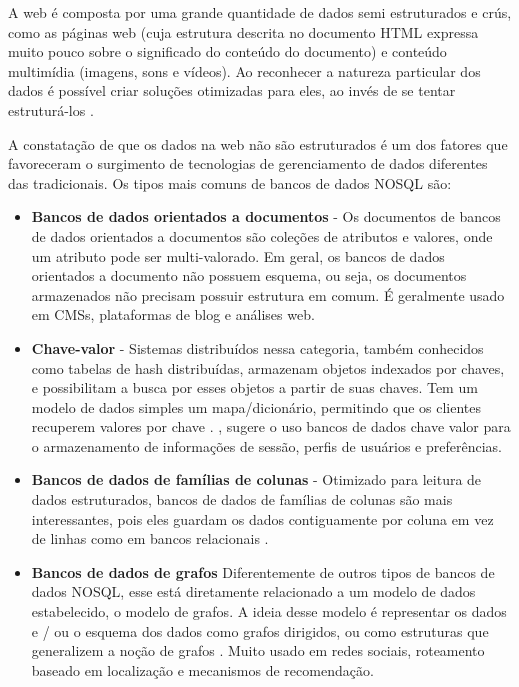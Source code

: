 \documentclass[a4paper,12pt]{monografia}
\begin{document}
\begin{citacao}
A web é composta por uma grande quantidade de dados semi estruturados e crús, como as páginas web (cuja estrutura descrita no documento HTML expressa muito pouco sobre o significado do conteúdo do documento) e conteúdo multimídia (imagens, sons e vídeos). Ao reconhecer a natureza particular dos dados é possível criar soluções otimizadas para eles, ao invés de se tentar estruturá-los \cite{de2010nosql}.
\end{citacao}

A constatação de que os dados na web não são estruturados é um dos fatores que favoreceram o surgimento de tecnologias de gerenciamento de dados diferentes das tradicionais. Os tipos mais comuns de bancos de dados NOSQL são:

\begin{itemize}
	\item  \textbf{Bancos de dados orientados a documentos} - Os documentos de bancos de dados orientados a documentos são coleções de atributos e valores, onde um atributo pode ser multi-valorado. Em geral, os bancos de dados orientados a documento não possuem esquema, ou seja, os documentos armazenados não precisam possuir estrutura em comum. É geralmente usado em CMSs, plataformas de blog e análises web.

	\item \textbf{Chave-valor} - Sistemas distribuídos nessa categoria, também conhecidos como tabelas de hash distribuídas, armazenam objetos indexados por chaves, e possibilitam a busca por esses objetos a partir de suas chaves. Tem um modelo de dados simples um mapa/dicionário, permitindo que os clientes recuperem valores por chave \cite{strauch2011nosql}. , sugere o uso bancos de dados chave valor para o armazenamento de informações de sessão, perfis de usuários e preferências.

	\item \textbf{Bancos de dados de famílias de colunas} - Otimizado para leitura de dados estruturados, bancos de dados de famílias de colunas são mais interessantes, pois eles guardam os dados contiguamente por coluna em vez de linhas como em bancos relacionais \cite{stonebraker2005c}.

	\item \textbf{Bancos de dados de grafos} Diferentemente de outros tipos de bancos de dados NOSQL, esse está diretamente relacionado a um modelo de dados estabelecido, o modelo de grafos. A ideia desse modelo é representar os dados e / ou o esquema dos dados como grafos dirigidos, ou como estruturas que generalizem a noção de grafos \cite{angles2008survey}. Muito usado em redes sociais, roteamento baseado em localização e mecanismos de recomendação.

\end{itemize}
\end{document}
